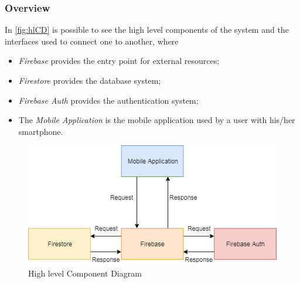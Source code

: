 \subsubsection{Overview}
In \autoref{fig:hlCD} is possible to see the high level components of the system and the interfaces used to connect one to another, where
\begin{itemize}
	\item \emph{Firebase} provides the entry point for external resources;
		\item \emph{Firestore} provides the database system;
			\item \emph{Firebase Auth} provides the authentication system;
	\item The \emph{Mobile Application} is the mobile application used by a user with his/her smartphone.
\end{itemize}

\begin{figure}[H]
	\includegraphics[width = \textwidth, keepaspectratio = true]{Img/HighLevelComponent}
	\caption{High level Component Diagram}
	\label{fig:hlCD}
\end{figure}

\clearpage
